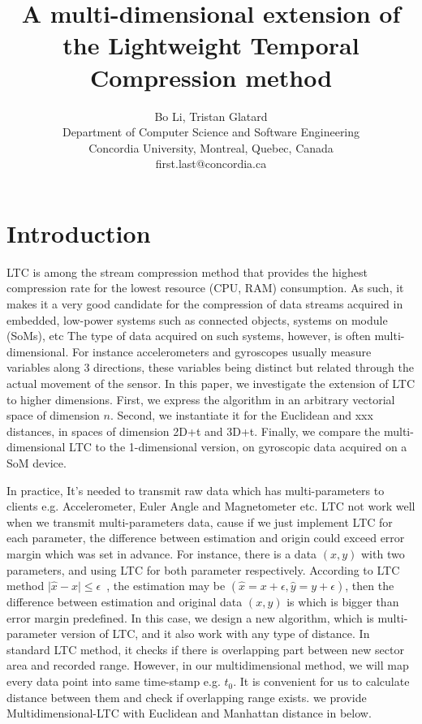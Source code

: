 \documentclass[10pt, conference, compsocconf]{IEEEtran}
\begin{document}
\title{A multi-dimensional extension of the Lightweight Temporal Compression method}

\author{Bo Li, Tristan Glatard\\
  Department of Computer Science and Software Engineering\\ Concordia University, Montreal, Quebec, Canada\\
  {first.last}@concordia.ca \vspace*{-0.5cm}}

\maketitle

\begin{abstract}
\end{abstract}

\section{Introduction}

LTC is among the stream compression method that provides the highest 
compression rate for the lowest resource (CPU, RAM) consumption. As 
such, it makes it a very good candidate for the compression of data 
streams acquired in embedded, low-power systems such as connected 
objects, systems on module (SoMs), etc The type of data acquired on 
such systems, however, is often multi-dimensional. For instance 
accelerometers and gyroscopes usually measure variables along 3 
directions, these variables being distinct but related through the 
actual movement of the sensor. In this paper, we investigate the 
extension of LTC to higher dimensions. First, we express the algorithm 
in an arbitrary vectorial space of dimension $n$. Second, we 
instantiate it for the Euclidean and xxx distances, in spaces of 
dimension 2D+t and 3D+t. Finally, we compare the multi-dimensional LTC 
to the 1-dimensional version, on gyroscopic data acquired on a SoM 
device.

In practice, It's needed to transmit raw data which has 
multi-parameters to clients e.g. Accelerometer, Euler Angle and 
Magnetometer etc. LTC not work well when we transmit multi-parameters 
data, cause if we just implement LTC for each parameter, the difference 
between estimation and origin could exceed error margin which was set 
in advance. For instance, there is a data $(x, y)$ with two parameters, 
and using LTC for both parameter respectively. According to LTC method 
$\mid{\hat{x}-x}\mid\leqslant \epsilon$~\cite{jalaleddine1990ecg}, the 
estimation may be $(\hat{x}=x+\epsilon, \hat{y}=y+\epsilon)$, then the 
difference between estimation and original data $(x,y)$ is which is 
bigger than error margin predefined. In this case, we design a new 
algorithm, which is multi-parameter version of LTC, and it also work 
with any type of distance. In standard LTC method, it checks if there 
is overlapping part between new sector area and recorded range. 
However, in our multidimensional method, we will map every data point 
into same time-stamp e.g. $t_0$. It is convenient for us to calculate 
distance between them and check if overlapping range exists. we provide 
Multidimensional-LTC with Euclidean and Manhattan distance in below.
\end{document}
